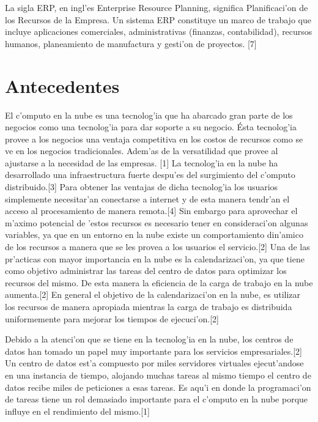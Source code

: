 La sigla ERP, en ingl'es Enterprise Resource Planning, significa Planificaci'on de los Recursos de la Empresa. Un sistema ERP constituye un marco de trabajo que incluye aplicaciones comerciales, administrativas (finanzas, contabilidad), recursos humanos, planeamiento de manufactura y gesti'on de proyectos. [7]


\section*{Antecedentes}

El c'omputo en la nube es una tecnolog'ia que ha abarcado gran parte de los negocios como una tecnolog'ia para dar soporte a su negocio. Ésta tecnolog'ia provee a los negocios una ventaja competitiva en los costos de recursos como se ve en los negocios tradicionales. Adem'as de la versatilidad que provee al ajustarse a la necesidad de las empresas. [1]
La tecnolog'ia en la nube ha desarrollado una infraestructura fuerte despu'es del surgimiento del c'omputo distribuido.[3] Para obtener las ventajas de dicha tecnolog'ia los usuarios simplemente necesitar'an conectarse a internet y de esta manera tendr'an el acceso al procesamiento de manera remota.[4] Sin embargo para aprovechar el m'aximo potencial de 'estos recursos es necesario tener en consideraci'on algunas variables, ya que en un entorno en la nube existe un comportamiento din'amico de los recursos a manera que se les provea a los usuarios el servicio.[2]
Una de las pr'acticas con mayor importancia en la nube es la calendarizaci'on, ya que tiene como objetivo  administrar las tareas del centro de datos para optimizar los recursos del mismo. De esta manera la eficiencia de la carga de trabajo en la nube aumenta.[2]
En general el objetivo de la calendarizaci'on en la nube, es utilizar los recursos de manera apropiada mientras la carga de trabajo es distribuida uniformemente para mejorar los tiempos de ejecuci'on.[2]

Debido a la atenci'on que se tiene en la tecnolog'ia en la nube, los centros de datos han tomado un papel muy importante para los servicios empresariales.[2] Un centro de datos est'a compuesto por miles servidores virtuales ejecut'andose en una instancia de tiempo, alojando muchas tareas al mismo tiempo el centro de datos recibe miles de peticiones a esas tareas. Es aqu'i en donde la programaci'on de tareas tiene un rol demasiado importante para el c'omputo en la nube porque influye en el rendimiento del mismo.[1] 

